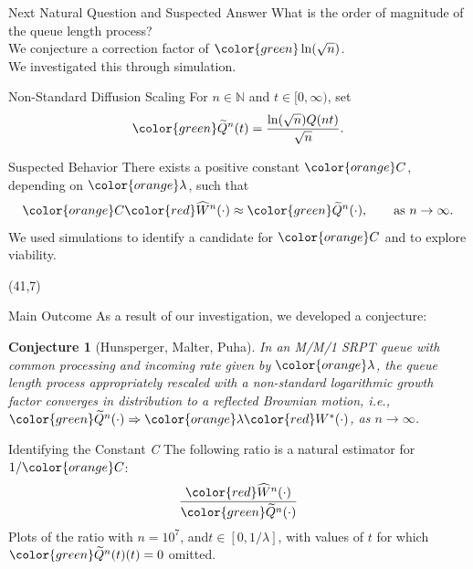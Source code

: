 \documentclass[16pt]{beamer}
\newtheorem{conjecture}[theorem]{Conjecture}
\newcommand{\Qtild}{\widetilde{Q}^{n}(t)}
\newcommand{\Wfhat}{\widehat{W}^{n}(\cdot)}
\newcommand{\Qftild}{\widetilde{Q}^{n}(\cdot)}
\begin{document}
\begin{frame}
\begin{textblock}{35}
\begin{block}{\huge Next Natural Question and Suspected Answer}
What is the order of magnitude of the queue length process?\\
We conjecture a correction factor of ${\color{green}\ln(\sqrt{n})}$.\\
We investigated this through simulation.
\vspace{\baselineskip}
\end{block}

\begin{block}{\huge Non-Standard Diffusion Scaling}
For $n\in{\mathbb N}$ and $t\in[0,\infty)$, set
\[
{\color{green}\widetilde{Q}^{n}(t) = \frac{\ln (\sqrt{n}) Q(nt) } {\sqrt{n}}}.
\]
\vspace{\baselineskip}
\end{block}
\begin{block}{\huge Suspected Behavior}
There exists a positive constant ${\color{orange}C}$, depending on ${\color{orange}\lambda}$, such that 
\vspace{\baselineskip}
\[
{\color{orange}C} {\color{red}\Wfhat} \approx {\color{green}\Qftild}, \qquad \text{as } n \rightarrow \infty.
\]
We used simulations to identify a candidate for ${\color{orange}C}$ and to explore viability.
\end{block}
\end{textblock}



\begin{textblock}{35}(41,7)
\begin{block}{\huge Main Outcome}
As a result of our investigation, we developed a conjecture:
\begin{framed}
\begin{conjecture} [Hunsperger, Malter, Puha]
In an M/M/1 SRPT queue with common processing and incoming rate given by ${\color{orange}\lambda}$,
the queue length process appropriately rescaled with a non-standard logarithmic growth
factor converges in distribution to a reflected Brownian motion, i.e.,
${\color{green}\widetilde{Q}^{n}(\cdot)} \Rightarrow {\color{orange}\lambda}{\color{red} W^{*}(\cdot)}$, as  $n \rightarrow \infty$.
\end{conjecture}
\end{framed}
\end{block}

\begin{block}{\huge Identifying the Constant \emph{{\color{orange}C}}}
The following ratio is a natural estimator for $1/{\color{orange}C}$:
\[
\frac{{\color{red}\Wfhat}}{{\color{green}\Qftild}}
\]
Plots of the ratio with $n=10^7$, and$t \in [0, 1/\lambda]$, with values of $t$ for which
${\color{green}\Qtild(t)} = 0$ omitted.


\end{block}
\end{textblock}
\end{frame}
\end{document}

